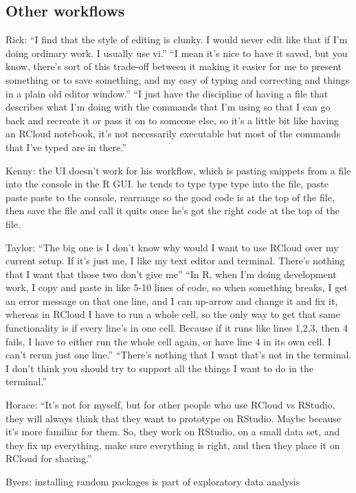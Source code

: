 \subsection{Other workflows}
Rick: ``I find that the style of editing is clunky. I would never edit like that
if I'm doing ordinary work. I usually use vi.'' ``I mean it's nice to have it
saved, but you know, there's sort of this trade-off between it making it easier
for me to present something or to save something, and my easy of typing and
correcting and things in a plain old editor window.'' ``I just have the
discipline of having a file that describes what I'm doing with the commands that
I'm using so that I can go back and recreate it or pass it on to someone else,
so it's a little bit like having an RCloud notebook, it's not necessarily
executable but most of the commands that I've typed are in there.''

Kenny: the UI doesn't work for his workflow, which is pasting snippets from a
file into the console in the R GUI.  he tends to type type type into the file,
paste paste paste to the console, rearrange so the good code is at the top of
the file, then save the file and call it quits once he's got the right code at
the top of the file.

Taylor: ``The big one is I don't know why would I want to use RCloud over my
current setup. If it's just me, I like my text editor and terminal. There's
nothing that I want that those two don't give me'' ``In R, when I'm doing
development work, I copy and paste in like 5-10 lines of code, so when something
breaks, I get an error message on that one line, and I can up-arrow and change
it and fix it, whereas in RCloud I have to run a whole cell, so the only way to
get that same functionality is if every line's in one cell. Because if it runs
like lines 1,2,3, then 4 fails, I have to either run the whole cell again, or
have line 4 in its own cell. I can't rerun just one line.'' ``There's nothing
that I want that's not in the terminal. I don't think you should try to support
all the things I want to do in the terminal.''

Horace: ``It's not for myself, but for other people who use RCloud vs RStudio,
they will always think that they want to prototype on RStudio. Maybe because
it's more familiar for them. So, they work on RStudio, on a small data set, and
they fix up everything, make sure everything is right, and then they place it on
RCloud for sharing.''

Byers: installing random packages is part of exploratory data analysis


